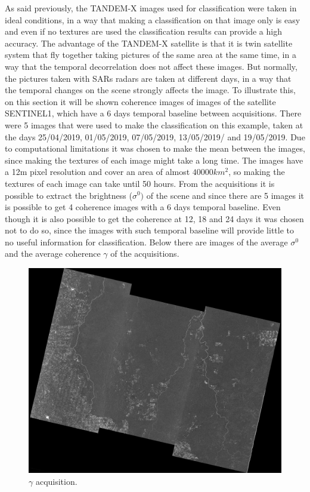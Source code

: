As said previously, the TANDEM-X images used for classification were taken in ideal conditions, in a way that making a classification on that image only is easy and even if no textures are used the classification results can provide a high accuracy. \newline
The advantage of the TANDEM-X satellite is that it is twin satellite system that fly together taking pictures of the same area at the same time, in a way that the temporal decorrelation does not affect these images. \newline
But normally, the pictures taken with SARs radars are taken at different days, in a way that the temporal changes on the scene strongly affects the image. \newline
To illustrate this, on this section it will be shown coherence images of images of the satellite SENTINEL1, which have a 6 days temporal baseline between acquisitions. There were 5 images that were used to make the classification on this example, taken at the days 25/04/2019, 01/05/2019, 07/05/2019, 13/05/2019/ and 19/05/2019. Due to computational limitations it was chosen to make the mean between the images, since making the textures of each image might take a long time. The images have a 12m pixel resolution and cover an area of almost $40000km^2$, so making the textures of each image can take until 50 hours. \newline
From the acquisitions it is possible to extract the brightness ($\sigma^0)$ of the scene and since there are 5 images it is possible to get 4 coherence images with a 6 days temporal baseline. Even though it is also possible to get the coherence at 12, 18 and 24 days it was chosen not to do so, since the images with such temporal baseline will provide little to no useful information for classification.
Below there are images of the average $\sigma^0$ and the average coherence $\gamma$ of the acquisitions.
\begin{figure}[H]
    \centering
    \includegraphics[width=0.75\linewidth]{Chapter5/SENTINEL1/geo_cohimage.pdf}
    \caption{$\gamma$ acquisition.}
    \label{fig:gamma_sentinel}
\end{figure}{}
